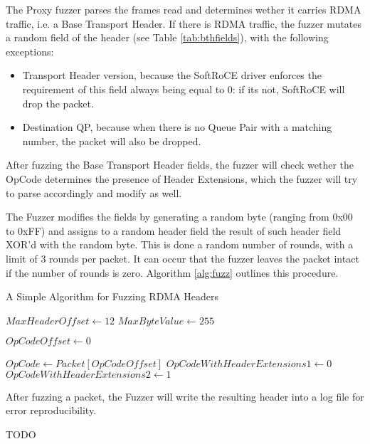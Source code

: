 The Proxy fuzzer parses the frames read and determines wether it carries RDMA traffic, i.e. a Base Transport Header.
If there is RDMA traffic, the fuzzer mutates a random field of the header (see Table \ref{tab:bthfields}), with the following exceptions:

\begin{itemize}
  \item Transport Header version, because the SoftRoCE driver enforces the requirement of this field always being equal to 0: if its not, SoftRoCE will drop the packet.
  \item Destination QP, because when there is no Queue Pair with a matching number, the packet will also be dropped.
\end{itemize}

After fuzzing the Base Transport Header fields, the fuzzer will check wether the OpCode determines the presence of Header Extensions,
which the fuzzer will try to parse accordingly and modify as well.

The Fuzzer modifies the fields by generating a random byte (ranging from 0x00 to 0xFF) and
assigns to a random header field the result of such header field XOR'd with the random byte. This is done a random number
of rounds, with a limit of 3 rounds per packet. It can occur that the fuzzer leaves the packet intact if the number of rounds is zero.
Algorithm \ref{alg:fuzz} outlines this procedure.

\SetAlgoVlined
\begin{algorithm}[t]
  \caption{A Simple Algorithm for Fuzzing RDMA Headers}
  \label{alg:fuzz}
  \LinesNumberedHidden
  \DontPrintSemicolon
  $MaxHeaderOffset \gets 12$\;
  $MaxByteValue \gets 255$\;

  $OpCodeOffset \gets 0$\;

  $OpCode \gets Packet[OpCodeOffset]$\;
  $OpCodeWithHeaderExtensions1 \gets 0$\;
  $OpCodeWithHeaderExtensions2 \gets 1$\;

\end{algorithm}

After fuzzing a packet, the Fuzzer will write the resulting header into a log file for error reproducibility.

TODO
